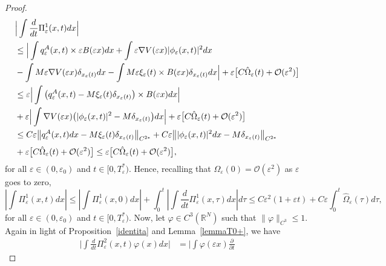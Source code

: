 \documentclass[11pt]{amsart}
\numberwithin{equation}{section}
\theoremstyle{definition}
\begin{document}
\begin{proof}
\begin{align}
	\label{estsmm1}
&   \Big|\int \frac{d}{dt}\Pi^1_{\varepsilon}(x,t)dx\Big| \\
&\leq \Big|\int q_{\varepsilon}^A(x,t)\times {\varepsilon} B({\varepsilon} x)dx+\int {\varepsilon}\nabla V({\varepsilon} x) |\phi_{\varepsilon}(x,t)|^{2} dx  \notag \\
& -\int M{\varepsilon}\nabla V({\varepsilon} x)\delta_{x_{\varepsilon}(t)}dx-\int M{\varepsilon}\xi_{\varepsilon}(t)\times B({\varepsilon} x)\delta_{x_{\varepsilon}(t)}dx\Big|
+ {\varepsilon}\big[ C\hat\Omega_{\varepsilon}(t)+{\mathcal O}({\varepsilon}^2) \big] \notag \\
&\leq  {\varepsilon}\Big|\int \big(q_{\varepsilon}^A(x,t)-M\xi_{\varepsilon}(t)\delta_{x_{\varepsilon}(t)}\big)\times  B({\varepsilon} x)dx\Big|  \notag \\
& +{\varepsilon}\Big|\int \nabla V({\varepsilon} x)\big(|\phi_{\varepsilon}(x,t)|^{2}-M\delta_{x_{\varepsilon} (t)}\big)dx\Big|
+ {\varepsilon}\big[ C\hat\Omega_{\varepsilon}(t)+{\mathcal O}({\varepsilon}^2) \big] \notag \\
&\leq C{\varepsilon}\big\|q_{\varepsilon}^A(x,t)dx-M\xi_{\varepsilon}(t)\delta_{x_{\varepsilon}(t)}\big\|_{C^{2*}}
+C{\varepsilon}\big\| |\phi_{\varepsilon}(x,t)|^{2}dx-M\delta_{x_{\varepsilon}(t)} \big\|_{C^{2*}}   \notag\\
\noalign{\vskip3pt}
& + {\varepsilon}\big[ C\hat\Omega_{\varepsilon}(t)+{\mathcal O}({\varepsilon}^2) \big]
\leq {\varepsilon}\big[ C\hat\Omega_{\varepsilon}(t)+{\mathcal O}({\varepsilon}^2) \big],  \notag
\end{align}
for all ${\varepsilon}\in (0,{\varepsilon}_0)$ and $t\in [0,T^*_{\varepsilon})$. Hence, recalling that
$\Omega_{\varepsilon}(0)=\mathcal O({\varepsilon}^2)$ as ${\varepsilon}$ goes to zero,
\begin{equation}\label{p1}
\left|\int \Pi^1_{\varepsilon}(x,t)dx\right|
\leq\left|\int \Pi^1_{\varepsilon}(x,0)dx\right|+\int_{0}^t
\left|\int\frac{d}{dt}\Pi^1_{\varepsilon}(x,\tau)dx\right|d\tau
\leq C{\varepsilon}^2(1+{\varepsilon} t)+C{\varepsilon}\int_{0}^t \hat\Omega_{\varepsilon}(\tau)d\tau,
\end{equation}
for all ${\varepsilon}\in (0,{\varepsilon}_0)$ and $t\in [0,T^*_{\varepsilon})$.
Now, let $\varphi\in C^3({{\mathbb R}}^N)$ such that $\|\varphi\|_{C^3}\leq 1$.
Again in light of Proposition~\ref{identita} and Lemma~\ref{lemmaT0+}, we have
\begin{align}
	\label{estsmm2}
\Big|\int \frac{d}{dt}\Pi^2_{\varepsilon}(x,t)\varphi(x)dx\Big| &
=\Big|\int \varphi({\varepsilon} x)\frac{\partial}{\partial t}

\end{align}
\end{proof}
\end{document}
